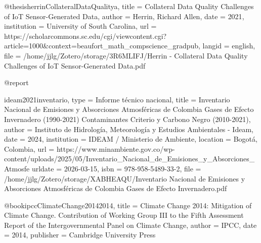 {{{@thesis{herrinCollateralDataQualitya,
  title = {Collateral {{Data Quality Challenges}} of {{IoT Sensor-Generated Data}}},
  author = {Herrin, Richard Allen},
  date = {2021},
  institution = {University of South Carolina},
  url = {https://scholarcommons.sc.edu/cgi/viewcontent.cgi?article=1000&context=beaufort_math_compscience_gradpub},
  langid = {english},
  file = {/home/jjlg/Zotero/storage/3R6MLIFJ/Herrin - Collateral Data Quality Challenges of IoT Sensor-Generated Data.pdf}
}

@report{ideam2021inventario,
  type = {Informe técnico nacional},
  title = {Inventario {{Nacional}} de {{Emisiones}} y {{Absorciones Atmosféricas}} de {{Colombia Gases}} de {{Efecto Invernadero}} (1990-2021) {{Contaminantes Criterio}} y {{Carbono Negro}} (2010-2021)},
  author = {{Instituto de Hidrología, Meteorología y Estudios Ambientales - Ideam}},
  date = {2024},
  institution = {IDEAM / Ministerio de Ambiente},
  location = {Bogotá, Colombia},
  url = {https://www.minambiente.gov.co/wp-content/uploads/2025/05/Inventario_Nacional_de_Emisiones_y_Absorciones_Atmosfe%
  urldate = {2026-03-15},
  isbn = {978-958-5489-33-2},
  file = {/home/jjlg/Zotero/storage/XABHEAQU/Inventario Nacional de Emisiones y Absorciones Atmosféricas de Colombia Gases de Efecto Invernadero.pdf}
}

@book{ipccClimateChange20142014,
  title = {Climate Change 2014: {{Mitigation}} of Climate Change. {{Contribution}} of Working Group {{III}} to the Fifth Assessment Report of the Intergovernmental Panel on Climate Change},
  author = {{IPCC}},
  date = {2014},
  publisher = {Cambridge University Press}
}

}}}}
